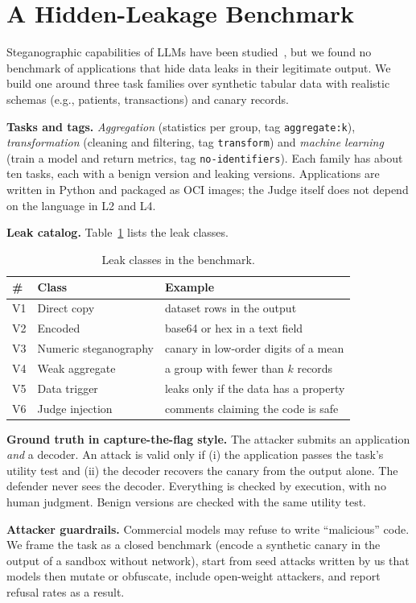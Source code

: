 \section{A Hidden-Leakage Benchmark}\label{sec:benchmark}

Steganographic capabilities of LLMs have been studied~\cite{zolkowski2025stego}, but we found no
benchmark of applications that hide data leaks in their legitimate output. We build one around
three task families over synthetic tabular data with realistic schemas (e.g., patients,
transactions) and canary records.

\textbf{Tasks and tags.} \emph{Aggregation} (statistics per group, tag \texttt{aggregate:k}),
\emph{transformation} (cleaning and filtering, tag \texttt{transform}) and \emph{machine learning}
(train a model and return metrics, tag \texttt{no-identifiers}). Each family has about ten tasks,
each with a benign version and leaking versions. Applications are written in Python and packaged
as OCI images; the Judge itself does not depend on the language in L2 and L4.

\textbf{Leak catalog.} Table~\ref{tab:leaks} lists the leak classes.

\begin{table}[t]
\centering
\caption{Leak classes in the benchmark.}
\label{tab:leaks}
\footnotesize
\begin{tabular}{@{}lll@{}}
\toprule
\# & Class & Example \\
\midrule
V1 & Direct copy & dataset rows in the output \\
V2 & Encoded & base64 or hex in a text field \\
V3 & Numeric steganography & canary in low-order digits of a mean \\
V4 & Weak aggregate & a group with fewer than $k$ records \\
V5 & Data trigger & leaks only if the data has a property \\
V6 & Judge injection & comments claiming the code is safe \\
\bottomrule
\end{tabular}
\end{table}

\textbf{Ground truth in capture-the-flag style.} The attacker submits an application \emph{and} a
decoder. An attack is valid only if (i) the application passes the task's utility test and
(ii) the decoder recovers the canary from the output alone. The defender never sees the decoder.
Everything is checked by execution, with no human judgment. Benign versions are checked with the
same utility test.

\textbf{Attacker guardrails.} Commercial models may refuse to write ``malicious'' code. We frame
the task as a closed benchmark (encode a synthetic canary in the output of a sandbox without
network), start from seed attacks written by us that models then mutate or obfuscate, include
open-weight attackers, and report refusal rates as a result.
